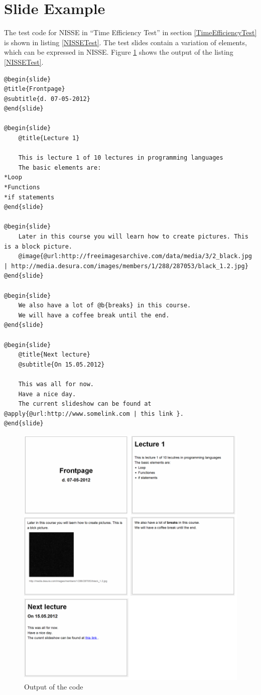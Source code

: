 \section{Slide Example}
\label{ASlideExample}
The test code for NISSE in ``Time Efficiency Test'' in section \ref{TimeEfficiencyTest} is shown in listing \ref{NISSETest}.
The test slides contain a variation of elements, which can be expressed in NISSE.
Figure \ref{fig:EfficiencyTest} shows the output of the listing \ref{NISSETest}.

\begin{lstlisting}[frame=single,caption=Time efficiency test code for NISSE, label=NISSETest]
@begin{slide}
@title{Frontpage}
@subtitle{d. 07-05-2012}
@end{slide}

@begin{slide}
    @title{Lecture 1}
    
    This is lecture 1 of 10 lectures in programming languages
    The basic elements are:
*Loop
*Functions
*if statements
@end{slide}

@begin{slide}
    Later in this course you will learn how to create pictures. This is a block picture.
    @image{@url:http://freeimagesarchive.com/data/media/3/2_black.jpg | http://media.desura.com/images/members/1/288/287053/black_1.2.jpg}
@end{slide}

@begin{slide}
    We also have a lot of @b{breaks} in this course.
    We will have a coffee break until the end.
@end{slide}

@begin{slide}
    @title{Next lecture}
    @subtitle{On 15.05.2012}
    
    This was all for now.
    Have a nice day.
    The current slideshow can be found at @apply{@url:http://www.somelink.com | this link }.
@end{slide}

\end{lstlisting}


\begin{figure}[htbp]
	\centering
		\includegraphics[width=1.00\textwidth]{./images/EfficiencyTest.png}
	\caption{Output of the code}
	\label{fig:EfficiencyTest}
\end{figure}